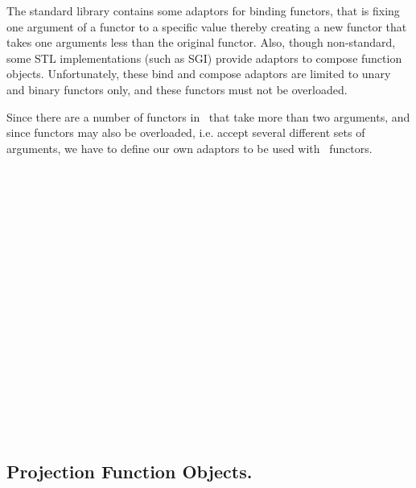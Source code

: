 The standard library contains some adaptors for binding functors, that
is fixing one argument of a functor to a specific value thereby
creating a new functor that takes one arguments less than the original
functor.  Also, though non-standard, some STL implementations (such as
SGI) provide adaptors to compose function objects. Unfortunately,
these bind and compose adaptors are limited to unary and binary
functors only, and these functors must not be overloaded.

Since there are a number of functors in \cgal\ that take more than two
arguments, and since functors may also be overloaded, i.e. accept
several different sets of arguments, we have to define our own
adaptors to be used with \cgal\ functors.

\\
\\
\\
\\
\\
\\
\\
\\
\\
\\
\\
\\
\\
\\
\\
\\
\\

\subsection*{Projection Function Objects.}

